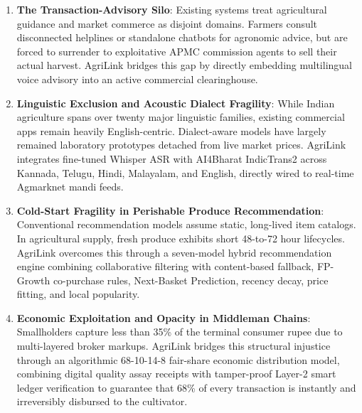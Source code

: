 \begin{enumerate}[label=\textbf{Gap \arabic*:}, leftmargin=2cm]
	\item \textbf{The Transaction-Advisory Silo}: Existing systems treat agricultural guidance and market commerce as disjoint domains. Farmers consult disconnected helplines \cite{Rehman2024} or standalone chatbots \cite{Rahman2025, Abhishek2025} for agronomic advice, but are forced to surrender to exploitative APMC commission agents to sell their actual harvest. AgriLink bridges this gap by directly embedding multilingual voice advisory into an active commercial clearinghouse.
	
	\item \textbf{Linguistic Exclusion and Acoustic Dialect Fragility}: While Indian agriculture spans over twenty major linguistic families, existing commercial apps remain heavily English-centric. Dialect-aware models \cite{Abhishek2025} have largely remained laboratory prototypes detached from live market prices. AgriLink integrates fine-tuned Whisper ASR with AI4Bharat IndicTrans2 across Kannada, Telugu, Hindi, Malayalam, and English, directly wired to real-time Agmarknet mandi feeds.
	
	\item \textbf{Cold-Start Fragility in Perishable Produce Recommendation}: Conventional recommendation models \cite{Sarwar2001, Koren2009} assume static, long-lived item catalogs. In agricultural supply, fresh produce exhibits short 48-to-72 hour lifecycles. AgriLink overcomes this through a seven-model hybrid recommendation engine combining collaborative filtering with content-based fallback, FP-Growth co-purchase rules, Next-Basket Prediction, recency decay, price fitting, and local popularity.
	
	\item \textbf{Economic Exploitation and Opacity in Middleman Chains}: Smallholders capture less than 35\% of the terminal consumer rupee due to multi-layered broker markups. AgriLink bridges this structural injustice through an algorithmic 68-10-14-8 fair-share economic distribution model, combining digital quality assay receipts with tamper-proof Layer-2 smart ledger verification to guarantee that 68\% of every transaction is instantly and irreversibly disbursed to the cultivator.
\end{enumerate}

\chapterend
